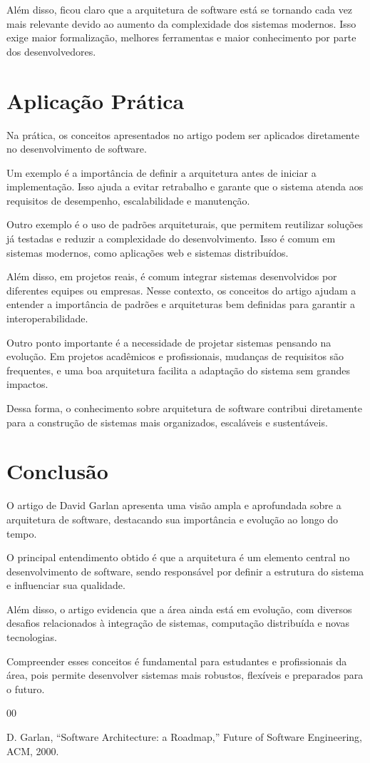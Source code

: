 \documentclass[conference]{IEEEtran}
\begin{document}
Além disso, ficou claro que a arquitetura de software está se tornando cada vez mais relevante devido ao aumento da complexidade dos sistemas modernos. Isso exige maior formalização, melhores ferramentas e maior conhecimento por parte dos desenvolvedores.

\section{Aplicação Prática}

Na prática, os conceitos apresentados no artigo podem ser aplicados diretamente no desenvolvimento de software.

Um exemplo é a importância de definir a arquitetura antes de iniciar a implementação. Isso ajuda a evitar retrabalho e garante que o sistema atenda aos requisitos de desempenho, escalabilidade e manutenção.

Outro exemplo é o uso de padrões arquiteturais, que permitem reutilizar soluções já testadas e reduzir a complexidade do desenvolvimento. Isso é comum em sistemas modernos, como aplicações web e sistemas distribuídos.

Além disso, em projetos reais, é comum integrar sistemas desenvolvidos por diferentes equipes ou empresas. Nesse contexto, os conceitos do artigo ajudam a entender a importância de padrões e arquiteturas bem definidas para garantir a interoperabilidade.

Outro ponto importante é a necessidade de projetar sistemas pensando na evolução. Em projetos acadêmicos e profissionais, mudanças de requisitos são frequentes, e uma boa arquitetura facilita a adaptação do sistema sem grandes impactos.

Dessa forma, o conhecimento sobre arquitetura de software contribui diretamente para a construção de sistemas mais organizados, escaláveis e sustentáveis.

\section{Conclusão}

O artigo de David Garlan apresenta uma visão ampla e aprofundada sobre a arquitetura de software, destacando sua importância e evolução ao longo do tempo.

O principal entendimento obtido é que a arquitetura é um elemento central no desenvolvimento de software, sendo responsável por definir a estrutura do sistema e influenciar sua qualidade.

Além disso, o artigo evidencia que a área ainda está em evolução, com diversos desafios relacionados à integração de sistemas, computação distribuída e novas tecnologias.

Compreender esses conceitos é fundamental para estudantes e profissionais da área, pois permite desenvolver sistemas mais robustos, flexíveis e preparados para o futuro.

\begin{thebibliography}{00}

D. Garlan,
``Software Architecture: a Roadmap,''
Future of Software Engineering, ACM, 2000.

\end{thebibliography}
\end{document}
